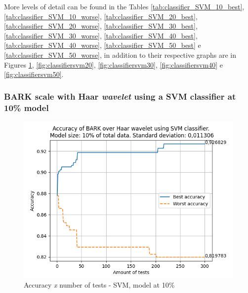 		\par More levels of detail can be found in the Tables \ref{tab:classifier_SVM_10_best}, \ref{tab:classifier_SVM_10_worse}, \ref{tab:classifier_SVM_20_best}, \ref{tab:classifier_SVM_20_worse}, \ref{tab:classifier_SVM_30_best}, \ref{tab:classifier_SVM_30_worse}, \ref{tab:classifier_SVM_40_best}, \ref{tab:classifier_SVM_40_worse}, \ref{tab:classifier_SVM_50_best} e \ref{tab:classifier_SVM_50_worse}, in addition to their respective graphs are in Figures \ref{fig:classifiersvm10}, \ref{fig:classifiersvm20}, \ref{fig:classifiersvm30}, \ref{fig:classifiersvm40} e \ref{fig:classifiersvm50}.
		
		
		
		\subsubsection{BARK scale with Haar \textit{wavelet} using a SVM classifier at 10\% model}
			
			\begin{figure}[H]
				\centering
				\includegraphics[scale=.6]{images/results/confusionMatrices/classifier_SVM_10.png}
				\caption{Accuracy \textit{x} number of tests - SVM, model at 10\%}
				\label{fig:classifiersvm10}
			\end{figure}
			

